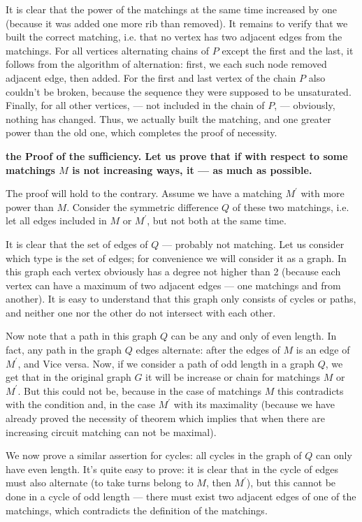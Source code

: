 It is clear that the power of the matchings at the same time increased by one (because it was added one more rib than removed). It remains to verify that we built the correct matching, i.e. that no vertex has two adjacent edges from the matchings. For all vertices alternating chains of $P$ except the first and the last, it follows from the algorithm of alternation: first, we each such node removed adjacent edge, then added. For the first and last vertex of the chain $P$ also couldn't be broken, because the sequence they were supposed to be unsaturated. Finally, for all other vertices, --- not included in the chain of $P$, --- obviously, nothing has changed. Thus, we actually built the matching, and one greater power than the old one, which completes the proof of necessity.

\bf{the Proof of the sufficiency}. Let us prove that if with respect to some matchings $M$ is not increasing ways, it --- as much as possible.

The proof will hold to the contrary. Assume we have a matching $M^\prime$ with more power than $M$. Consider the symmetric difference $Q$ of these two matchings, i.e. let all edges included in $M$ or $M^\prime$, but not both at the same time.

It is clear that the set of edges of $Q$ --- probably not matching. Let us consider which type is the set of edges; for convenience we will consider it as a graph. In this graph each vertex obviously has a degree not higher than 2 (because each vertex can have a maximum of two adjacent edges --- one matchings and from another). It is easy to understand that this graph only consists of cycles or paths, and neither one nor the other do not intersect with each other.

Now note that a path in this graph $Q$ can be any and only of even length. In fact, any path in the graph $Q$ edges alternate: after the edges of $M$ is an edge of $M^\prime$, and Vice versa. Now, if we consider a path of odd length in a graph $Q$, we get that in the original graph $G$ it will be increase or chain for matchings $M$ or $M^\prime$. But this could not be, because in the case of matchings $M$ this contradicts with the condition and, in the case $M^\prime$ with its maximality (because we have already proved the necessity of theorem which implies that when there are increasing circuit matching can not be maximal).

We now prove a similar assertion for cycles: all cycles in the graph of $Q$ can only have even length. It's quite easy to prove: it is clear that in the cycle of edges must also alternate (to take turns belong to $M$, then $M^\prime$), but this cannot be done in a cycle of odd length --- there must exist two adjacent edges of one of the matchings, which contradicts the definition of the matchings.

